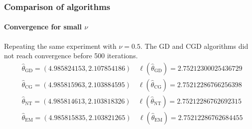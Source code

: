 \documentclass[aspectratio=169]{beamer}
\begin{document}
\begin{frame}
    \frametitle{Comparison of algorithms}
    \framesubtitle{Convergence for small $\nu$}
    Repeating the same experiment with $\nu = 0.5$. The GD and CGD algorithms did not reach convergence before 500 iterations.
    \begin{align*}
        &\hat\theta_{\text{GD}}=(4.985824153, 2.107854186) \quad \ell(\hat\theta_{\text{GD}})=2.75212300025436729\\
        &\hat\theta_{\text{CG}}=(4.985815963, 2.103884595) \quad \ell(\hat\theta_{\text{CG}})=2.75212286766256398\\
        &\hat\theta_{\text{NT}}=(4.985814613, 2.103818326) \quad \ell(\hat\theta_{\text{NT}})=2.75212286762692315\\
        &\hat\theta_{\text{EM}}=(4.985815835, 2.103821265) \quad \ell(\hat\theta_{\text{EM}})=2.75212286762684455
    \end{align*}
\end{frame}
\end{document}
